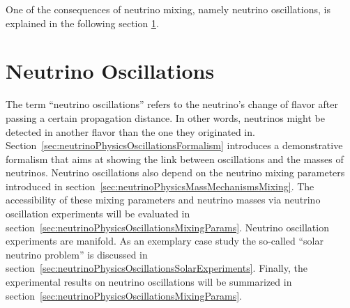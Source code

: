 One of the consequences of neutrino mixing, namely neutrino oscillations, is explained in the following section \ref{sec:neutrinoPhysicsOscillations}.

\section{Neutrino Oscillations}
\label{sec:neutrinoPhysicsOscillations}
The term ``neutrino oscillations'' refers to the neutrino's change of flavor after passing a certain propagation distance. In other words, neutrinos might be detected in another flavor than the one they originated in.
Section~\ref{sec:neutrinoPhysicsOscillationsFormalism} introduces a demonstrative formalism that aims at showing the link between oscillations and the masses of neutrinos. Neutrino oscillations also depend on the neutrino mixing parameters introduced in section~\ref{sec:neutrinoPhysicsMassMechanismsMixing}. The accessibility of these mixing parameters and neutrino masses via neutrino oscillation experiments will be evaluated in section~\ref{sec:neutrinoPhysicsOscillationsMixingParams}. Neutrino oscillation experiments are manifold. As an exemplary case study the so-called ``solar neutrino problem'' is discussed in section~\ref{sec:neutrinoPhysicsOscillationsSolarExperiments}. Finally, the experimental results on neutrino oscillations will be summarized in section~\ref{sec:neutrinoPhysicsOscillationsMixingParams}. 

